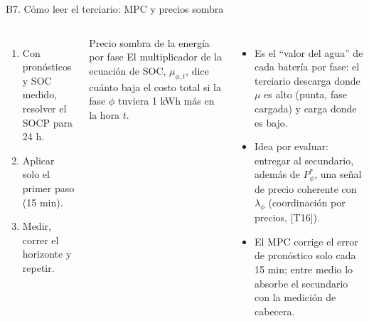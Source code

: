 \documentclass[aspectratio=169,10pt,t]{beamer}
\begin{document}
\begin{frame}{B7. Cómo leer el terciario: MPC y precios sombra}
  \begin{columns}[T,onlytextwidth]
    \centering

    \vspace{4pt}
    \footnotesize\raggedright
    \begin{enumerate}\setlength\itemsep{1pt}
      \item Con pronósticos y SOC medido, resolver el SOCP para 24 h.
      \item Aplicar solo el primer paso (15 min).
      \item Medir, correr el horizonte y repetir.
    \end{enumerate}
    \footnotesize
    \begin{block}{Precio sombra de la energía por fase}
      \footnotesize El multiplicador de la ecuación de SOC, $\mu_{\phi,t}$, dice cuánto baja el costo total si la fase $\phi$ tuviera 1 kWh más en la hora $t$.
    \end{block}
    \begin{itemize}\setlength\itemsep{3pt}
      \item Es el ``valor del agua'' de cada batería por fase: el terciario descarga donde $\mu$ es alto (punta, fase cargada) y carga donde es bajo.
      \item Idea por evaluar: entregar al secundario, además de $P^*_\phi$, una señal de precio coherente con $\lambda_\phi$ (coordinación por precios, [T16]).
      \item El MPC corrige el error de pronóstico solo cada 15 min; entre medio lo absorbe el secundario con la medición de cabecera.
    \end{itemize}
  \end{columns}
\end{frame}
\end{document}
